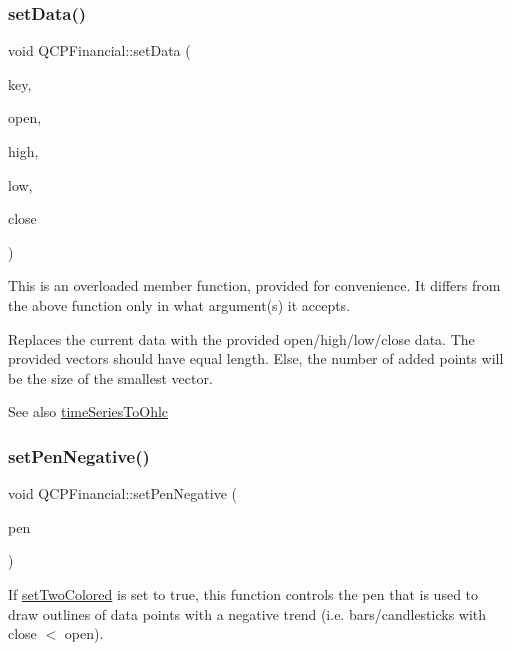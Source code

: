 \subsubsection{\texorpdfstring{set\+Data()}{setData()}\hspace{0.1cm}{\footnotesize\ttfamily [2/2]}}
{\footnotesize\ttfamily void Q\+C\+P\+Financial\+::set\+Data (\begin{DoxyParamCaption}\item[{const Q\+Vector$<$ double $>$ \&}]{key,  }\item[{const Q\+Vector$<$ double $>$ \&}]{open,  }\item[{const Q\+Vector$<$ double $>$ \&}]{high,  }\item[{const Q\+Vector$<$ double $>$ \&}]{low,  }\item[{const Q\+Vector$<$ double $>$ \&}]{close }\end{DoxyParamCaption})}

This is an overloaded member function, provided for convenience. It differs from the above function only in what argument(s) it accepts.

Replaces the current data with the provided open/high/low/close data. The provided vectors should have equal length. Else, the number of added points will be the size of the smallest vector.

\begin{DoxySeeAlso}{See also}
\mbox{\hyperlink{class_q_c_p_financial_a0c3453d1c03e320950fdd2df54e3ebc8}{time\+Series\+To\+Ohlc}} 
\end{DoxySeeAlso}
\mbox{\label{class_q_c_p_financial_afe5c07e94ccea01a75b3a2476993c346}} 
\subsubsection{\texorpdfstring{set\+Pen\+Negative()}{setPenNegative()}}
{\footnotesize\ttfamily void Q\+C\+P\+Financial\+::set\+Pen\+Negative (\begin{DoxyParamCaption}\item[{const Q\+Pen \&}]{pen }\end{DoxyParamCaption})}

If \mbox{\hyperlink{class_q_c_p_financial_a138e44aac160a17a9676652e240c5f08}{set\+Two\+Colored}} is set to true, this function controls the pen that is used to draw outlines of data points with a negative trend (i.\+e. bars/candlesticks with close $<$ open).

